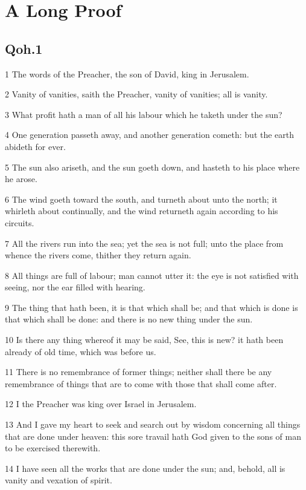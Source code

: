 \documentclass[12pt]{report}
\begin{document}
    \appendix
    \chapter{A Long Proof}

\section{Qoh.1}

1 The words of the Preacher, the son of David, king in Jerusalem.

2 Vanity of vanities, saith the Preacher, vanity of vanities; all is
vanity.

3 What profit hath a man of all his labour which he taketh under the
sun?

4 One generation passeth away, and another generation cometh: but the
earth abideth for ever.

5 The sun also ariseth, and the sun goeth down, and hasteth to his
place where he arose.

6 The wind goeth toward the south, and turneth about unto the north;
it whirleth about continually, and the wind returneth again according
to his circuits.

7 All the rivers run into the sea; yet the sea is not full; unto the
place from whence the rivers come, thither they return again.

   
8 All things are full of labour; man cannot utter it: the eye is
   not
   satisfied with seeing, nor the ear filled with hearing.
   
9 The thing that hath been, it is that which shall be; and that
   which is done is that which shall be done: and there is no new
   thing
   under the sun.
   
10 Is there any thing whereof it may be said, See, this is new?
   it
   hath been already of old time, which was before us.
   
11 There is no remembrance of former things; neither shall there
   be
   any remembrance of things that are to come with those that shall
   come
   after.
   
12 I the Preacher was king over Israel in Jerusalem.
   
13 And I gave my heart to seek and search out by wisdom
   concerning
   all things that are done under heaven: this sore travail hath God
   given to the sons of man to be exercised therewith.
   
14 I have seen all the works that are done under the sun; and,
   behold, all is vanity and vexation of spirit.
   
\end{document}

